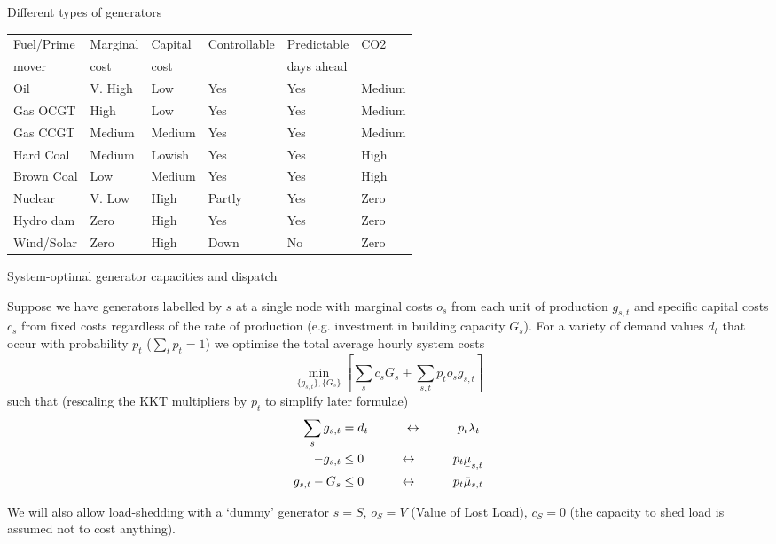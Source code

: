 \documentclass[10pt,aspectratio=169,dvipsnames]{beamer}
\newcommand{\ra}[1]{\renewcommand{\arraystretch}{#1}}
\def\l{\lambda}
\def\m{\mu}
\newcommand{\ubar}[1]{\text{\b{$#1$}}}
\begin{document}
\begin{frame}{Different types of generators}

\ra{1.1}
\begin{table}[!t]
	\centering
	\begin{tabular}{@{}llllll@{}}
\toprule
Fuel/Prime  & Marginal & Capital & Controllable & Predictable & CO2 \\
mover & cost & cost & & days ahead & \\
\midrule
Oil & V. High & Low & Yes & Yes & Medium \\
Gas OCGT & High & Low & Yes & Yes & Medium \\
Gas CCGT & Medium & Medium & Yes & Yes & Medium \\
Hard Coal & Medium & Lowish & Yes & Yes & High \\
Brown Coal & Low & Medium & Yes & Yes & High \\
Nuclear & V. Low & High & Partly & Yes & Zero \\
Hydro dam & Zero & High & Yes & Yes & Zero \\
Wind/Solar & Zero & High & Down & No & Zero \\
\bottomrule
	\end{tabular}
\end{table}

\end{frame}


\begin{frame}{System-optimal generator capacities and dispatch}

  Suppose we have generators labelled by $s$ at a single node with \alert{marginal costs} $o_s$ from each unit of
  production $g_{s,t}$ and \alert{specific capital costs} $c_s$ from fixed costs
  regardless of the rate of production (e.g. investment in building
  capacity $G_s$).   For a variety of demand values $d_t$ that occur with probability $p_t$ ($\sum_t p_t = 1$)   we optimise the total \alert{average hourly system costs}
  \begin{equation*}
    \min_{\{g_{s,t}\},\{G_s\}}  \left[\sum_{s}c_s G_s +  \sum_{s,t} p_t o_{s} g_{s,t} \right]
  \end{equation*}
  such that (rescaling the KKT multipliers by $p_t$ to simplify later formulae)
  \begin{align*}
    \sum_s g_{s,t} & = d_t  \hspace{1cm}\leftrightarrow\hspace{1cm} p_t \l_t \\
    - g_{s,t}  & \leq  0  \hspace{1cm}\leftrightarrow\hspace{1cm} p_t \ubar{\m}_{s,t} \\
    g_{s,t} - G_s  & \leq 0  \hspace{1cm}\leftrightarrow\hspace{1cm} p_t \bar{\m}_{s,t}
  \end{align*}

  We will also allow load-shedding with a `dummy' generator $s=S$,
  $o_S = V$ (Value of Lost Load), $c_S=0$ (the capacity to shed load
  is assumed not to cost anything).

\end{frame}
\end{document}
